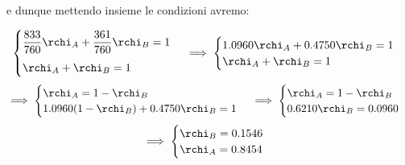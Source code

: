 e dunque mettendo insieme le condizioni avremo:

$$\begin{cases}
    \displaystyle \frac{833}{760}\rchi_A + \frac{361}{760}\rchi_B=1\\[0.3cm]
    \rchi_A + \rchi_B=1
\end{cases}
\implies
\begin{cases}
    1.0960\rchi_A + 0.4750\rchi_B=1\\
    \rchi_A + \rchi_B=1
\end{cases}$$
$$\implies
\begin{cases}
    \rchi_A=1 - \rchi_B\\
    1.0960(1 - \rchi_B) + 0.4750\rchi_B=1
\end{cases}
\implies
\begin{cases}
    \rchi_A=1 - \rchi_B\\
    0.6210 \rchi_B=0.0960
\end{cases}$$
$$\implies
\begin{cases}
    \rchi_B=0.1546\\
    \rchi_A=0.8454
\end{cases}$$